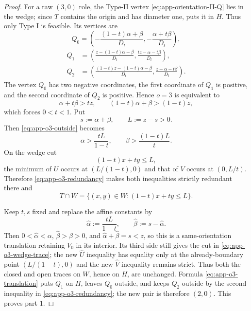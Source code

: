 \begin{proof}
For a raw $(3,0)$ role, the Type-II vertex
\eqref{eq:app-orientation-II-Q} lies in the wedge; since $T$ contains the
origin and has diameter one,  puts it in
$H$.  Thus only Type I is feasible.  Its vertices are
\[
 Q_0=\left(
 -\frac{(1-t)\alpha+\beta}{D_t},
 -\frac{\alpha+t\beta}{D_t}
 \right),
\]
\begin{equation}
 \begin{aligned}
 Q_1&=\left(
 \frac{z-(1-t)\alpha-\beta}{D_t},
 \frac{tz-\alpha-t\beta}{D_t}
 \right),\\
 Q_2&=\left(
 \frac{(1-t)z-(1-t)\alpha-\beta}{D_t},
 \frac{z-\alpha-t\beta}{D_t}
 \right).
 \end{aligned}
 \label{eq:app-o3-vertices}
\end{equation}
The vertex $Q_0$ has two negative coordinates, the first coordinate of
$Q_1$ is positive, and the second coordinate of $Q_2$ is positive.  Hence
$o=3$ is equivalent to
\begin{equation}
 \alpha+t\beta>tz,
 \qquad
 (1-t)\alpha+\beta>(1-t)z,
 \label{eq:app-o3-outside}
\end{equation}
which forces $0<t<1$.  Put
\[
 s:=\alpha+\beta,
 \qquad
 L:=z-s>0.
\]
Then \eqref{eq:app-o3-outside} becomes
\begin{equation}
 \alpha>\frac{tL}{1-t},
 \qquad
 \beta>\frac{(1-t)L}{t}.
 \label{eq:app-o3-redundancy}
\end{equation}
On the wedge cut
\[
 (1-t)x+ty\le L,
\]
the minimum of $U$ occurs at $(L/(1-t),0)$ and that of $V$ occurs at
$(0,L/t)$.  Therefore \eqref{eq:app-o3-redundancy} makes both inequalities
strictly redundant there and
\begin{equation}
 T\cap W=\{(x,y)\in W:(1-t)x+ty\le L\}.
 \label{eq:app-o3-wedge-trace}
\end{equation}

Keep $t,s$ fixed and replace the affine constants by
\begin{equation}
 \widehat\alpha:=\frac{tL}{1-t},
 \qquad
 \widehat\beta:=s-\widehat\alpha.
 \label{eq:app-o3-translation}
\end{equation}
Then $0<\widehat\alpha<\alpha$, $\widehat\beta>\beta>0$, and
$\widehat\alpha+\widehat\beta=s<z$, so this is a same-orientation
translation retaining $V_0$ in its interior.  Its third side still gives
the cut in \eqref{eq:app-o3-wedge-trace}; the new $\widehat U$ inequality
has equality only at the already-boundary point $(L/(1-t),0)$ and the new
$\widehat V$ inequality remains strict.  Thus both the closed and open
traces on $W$, hence on $H$, are unchanged.  Formula
\eqref{eq:app-o3-translation} puts $Q_1$ on $H$, leaves $Q_0$ outside, and
keeps $Q_2$ outside by the second inequality in
\eqref{eq:app-o3-redundancy}; the new pair is therefore $(2,0)$.  This proves
part 1.


\end{proof}
